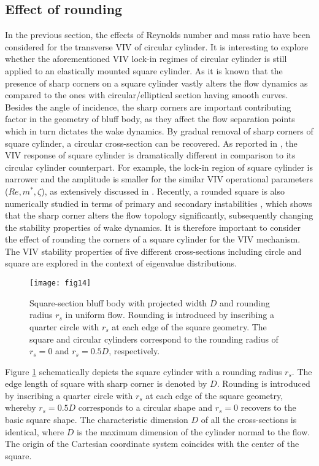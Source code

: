 \documentclass{jfm}
\begin{document}
\subsection{Effect of rounding}\label{sec:square}
In the previous section, the effects of Reynolds number and mass ratio have 
been considered for the transverse VIV of circular cylinder. 
It is interesting to explore whether the aforementioned VIV lock-in regimes
of circular cylinder is still applied to an elastically mounted square cylinder. 
As it is known that the presence of sharp corners on a square cylinder vastly 
alters the flow dynamics as compared to the ones with circular/elliptical section 
having smooth curves. Besides the angle of incidence, the sharp corners are 
important contributing factor in the geometry of bluff body, as they 
affect the flow separation points which in turn dictates the wake dynamics.
By gradual removal of sharp corners of square cylinder, 
a circular cross-section can be recovered.
%
%
%
As reported in \cite{Jaiman2015}, the VIV response of square cylinder is dramatically different
in comparison to its circular cylinder counterpart.
For example, the lock-in region of square cylinder is narrower and the amplitude 
is smaller for the similar VIV operational parameters ($Re, m^*, \zeta$), 
as extensively discussed in \cite{Jaiman2016a,Jaiman2016b}. 
%
Recently, a rounded square is also numerically studied in 
terms of primary and secondary instabilities
\citep{Park2016}, which shows that the sharp corner alters 
the flow topology significantly,
subsequently changing the stability properties of wake dynamics. 
%
It is therefore important to consider the effect of rounding the corners of a square 
cylinder for the VIV mechanism. 
The VIV stability properties of five different 
cross-sections including circle and square are explored in the context of eigenvalue 
distributions.
\begin{figure}
\centering
    \texttt{[image: fig14]}
    \label{fig:square_schematic}
     \caption{Square-section bluff body with projected width $D$ and
     rounding radius $r_{s}$ in uniform flow. 
      Rounding is introduced by inscribing a quarter circle with $r_{s}$ at each edge of 
      the square geometry.
      The square and circular cylinders correspond 
to the rounding radius of $r_{s}=0$ and $r_{s}=0.5D$, respectively. 
     }
	\label{fig:square}
\end{figure}

Figure \ref{fig:square} schematically depicts the 
square cylinder with a rounding radius $r_s$. The edge length of square 
with sharp corner is denoted by $D$. 
{Rounding is introduced by inscribing a quarter circle with $r_{s}$ at each edge of 
the square geometry, whereby $r_{s}=0.5D$  corresponds to a circular shape 
and $r_{s}=0$ recovers to the basic square shape.}
%
The characteristic dimension $D$ of all the cross-sections is identical,  
where $D$ is the maximum dimension of the cylinder normal to the flow.
%
The origin of the Cartesian coordinate system 
coincides with the center of the square. 
 
\end{document}
